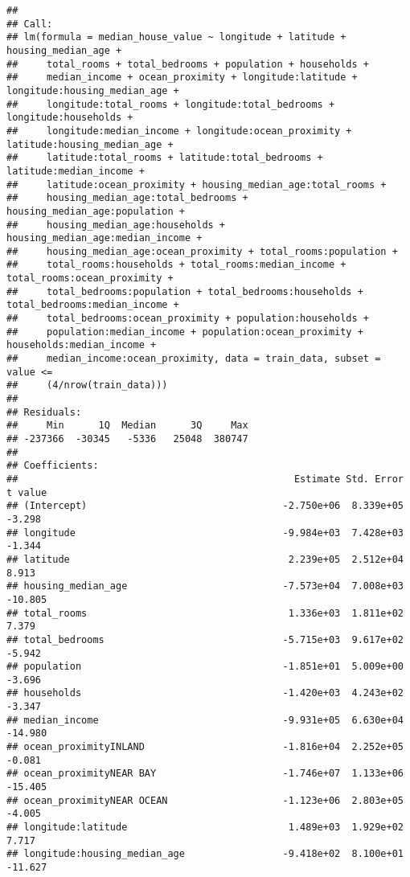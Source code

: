 \documentclass[
]{article}
\begin{document}
\begin{verbatim}
## 
## Call:
## lm(formula = median_house_value ~ longitude + latitude + housing_median_age + 
##     total_rooms + total_bedrooms + population + households + 
##     median_income + ocean_proximity + longitude:latitude + longitude:housing_median_age + 
##     longitude:total_rooms + longitude:total_bedrooms + longitude:households + 
##     longitude:median_income + longitude:ocean_proximity + latitude:housing_median_age + 
##     latitude:total_rooms + latitude:total_bedrooms + latitude:median_income + 
##     latitude:ocean_proximity + housing_median_age:total_rooms + 
##     housing_median_age:total_bedrooms + housing_median_age:population + 
##     housing_median_age:households + housing_median_age:median_income + 
##     housing_median_age:ocean_proximity + total_rooms:population + 
##     total_rooms:households + total_rooms:median_income + total_rooms:ocean_proximity + 
##     total_bedrooms:population + total_bedrooms:households + total_bedrooms:median_income + 
##     total_bedrooms:ocean_proximity + population:households + 
##     population:median_income + population:ocean_proximity + households:median_income + 
##     median_income:ocean_proximity, data = train_data, subset = value <= 
##     (4/nrow(train_data)))
## 
## Residuals:
##     Min      1Q  Median      3Q     Max 
## -237366  -30345   -5336   25048  380747 
## 
## Coefficients:
##                                                Estimate Std. Error t value
## (Intercept)                                  -2.750e+06  8.339e+05  -3.298
## longitude                                    -9.984e+03  7.428e+03  -1.344
## latitude                                      2.239e+05  2.512e+04   8.913
## housing_median_age                           -7.573e+04  7.008e+03 -10.805
## total_rooms                                   1.336e+03  1.811e+02   7.379
## total_bedrooms                               -5.715e+03  9.617e+02  -5.942
## population                                   -1.851e+01  5.009e+00  -3.696
## households                                   -1.420e+03  4.243e+02  -3.347
## median_income                                -9.931e+05  6.630e+04 -14.980
## ocean_proximityINLAND                        -1.816e+04  2.252e+05  -0.081
## ocean_proximityNEAR BAY                      -1.746e+07  1.133e+06 -15.405
## ocean_proximityNEAR OCEAN                    -1.123e+06  2.803e+05  -4.005
## longitude:latitude                            1.489e+03  1.929e+02   7.717
## longitude:housing_median_age                 -9.418e+02  8.100e+01 -11.627

\end{verbatim}
\end{document}
